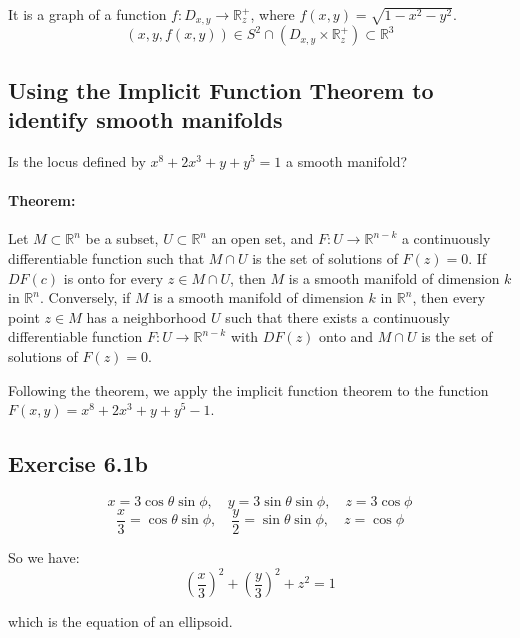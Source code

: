 \documentclass[11pt]{article}
\begin{document}
It is a graph of a function $f : D_{x,y} \rightarrow \mathbb{R}^{+}_{z}$, where $f(x,y) = \sqrt{1 - x^2 - y^2}$.
\[
(x,y,f(x,y)) \in S^2 \cap (D_{x,y} \times \mathbb{R}^{+}_{z}) \subset \mathbb{R}^3
\]

\subsection{Using the Implicit Function Theorem to identify smooth manifolds}
Is the locus defined by $x^8 + 2x^3 + y + y^5 = 1$ a smooth manifold?

\paragraph{Theorem:} Let $M \subset \mathbb{R}^n$ be a subset, $U \subset \mathbb{R}^n$ an open set, and $F : U \rightarrow \mathbb{R}^{n-k}$ a continuously differentiable function such that $M \cap U$ is the set of solutions of $F(z) = 0$. If $DF(c)$ is onto for every $z \in M \cap U$, then $M$ is a smooth manifold of dimension $k$ in $\mathbb{R}^n$.
Conversely, if $M$ is a smooth manifold of dimension $k$ in $\mathbb{R}^n$, then every point $z \in M$ has a neighborhood $U$ such that there exists a continuously differentiable function $F : U \rightarrow \mathbb{R}^{n-k}$ with $DF(z)$ onto and $M \cap U$ is the set of solutions of $F(z) = 0$.

Following the theorem, we apply the implicit function theorem to the function $F(x,y) = x^8 + 2x^3 + y + y^5 - 1$.

\subsection*{Exercise 6.1b}
\[
x = 3 \cos \theta \sin \phi, \quad y = 3 \sin \theta \sin \phi, \quad z = 3 \cos \phi
\]
\[
\dfrac{x}{3} = \cos \theta \sin \phi, \quad \dfrac{y}{2} = \sin \theta \sin \phi, \quad z = \cos \phi
\]

So we have:
\[
\left(\dfrac{x}{3}\right)^2 + \left(\dfrac{y}{3}\right)^2 + z^2 = 1
\]

which is the equation of an ellipsoid.

\begin{center}
\end{center}
\end{document}
